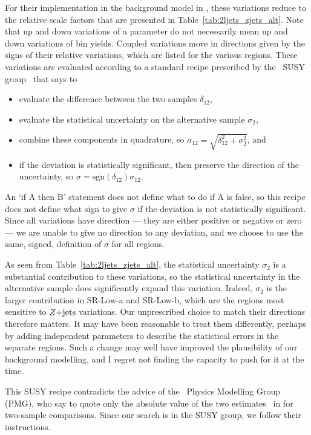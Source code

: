 For their implementation in the background model in \histfactory, these
variations reduce to the relative scale factors that are presented in
Table~\ref{tab:2ljets_zjets_alt}.
Note that up and down variations of a parameter do not
necessarily mean up and down variations of bin yields.
Coupled variations move in directions given by the signs of their relative
variations, which are listed for the various regions.
These variations are evaluated according to a standard recipe prescribed by
the \atlas\ SUSY group~\cite{atlas_twiki_susytheoretical} that says to
\begin{itemize}
\item evaluate the difference between the two samples $\delta_{12}$,
\item evaluate the statistical uncertainty on the alternative sample
$\sigma_2$,
\item combine these components in quadrature, so
$\sigma_{12} = \sqrt{\delta_{12}^2 + \sigma_2^2}$, and
\item if the deviation is statistically significant, then preserve the direction
of the uncertainty, so $\sigma = \mathrm{sgn}(\delta_{12})\sigma_{12}$.
\end{itemize}
An `if $\mathrm{A}$ then $\mathrm{B}$' statement does not define what to do if
$\mathrm{A}$ is false, so this recipe does not define what sign to give
$\sigma$ if the deviation is not statistically significant.
Since all variations have direction
--- they are either positive or negative or zero ---
we are unable to give no direction to any deviation, and we choose to
use the same, signed, definition of $\sigma$ for all regions.

As seen from Table~\ref{tab:2ljets_zjets_alt}, the statistical uncertainty
$\sigma_2$ is a substantial contribution to these variations, so
the statistical uncertainty in the alternative sample does significantly
expand this variation.
Indeed, $\sigma_2$ is the larger contribution in SR-Low-a and SR-Low-b, which
are the regions most sensitive to $Z\mathrm{+jets}$ variations.
Our unprescribed choice to match their directions therefore matters.
It may have been reasonable to treat them differently, perhaps by adding
independent parameters to describe the statistical errors in the separate
regions.
Such a change may well have improved the plausibility of our background
modelling, and I regret not finding the capacity to push for it at the time.

This SUSY recipe contradicts the advice of the \atlas\ Physics Modelling Group
(PMG), who say to quote only the absolute value of the two
estimates~\cite{atlas_twiki_pmg_theory} in for two-sample
comparisons.
Since our search is in the SUSY group, we follow their instructions.

